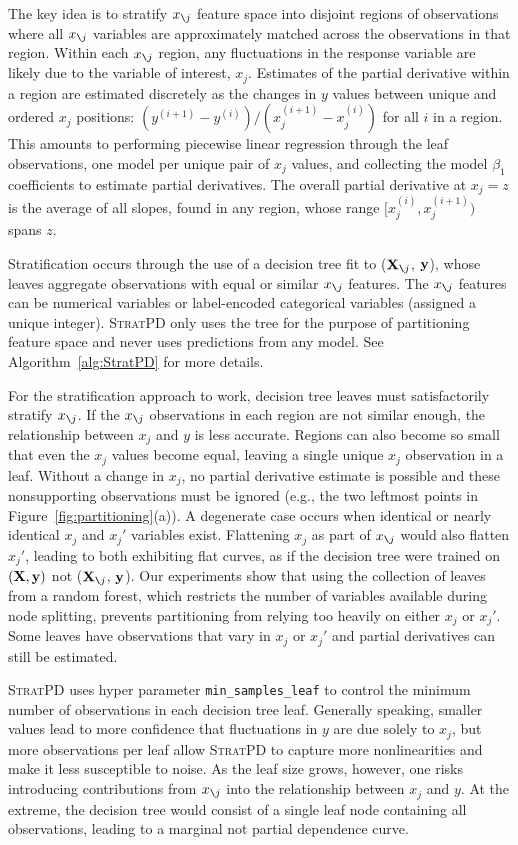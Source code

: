 \documentclass{article}
\newcommand{\figref}[1]{Figure~\ref{#1}}
\newcommand{\algref}[1]{Algorithm~\ref{#1}}
\newcommand{\spd}{\fontfamily{cmr}\textsc{\small StratPD}}
\newcommand{\Xnj}{${\bf X}_{\texttt{\char`\\} j}$}
\newcommand{\xnj}{$x_{\texttt{\char`\\} j}$}
\newcommand{\yi}{y^{(i)}}
\begin{document}
The key idea is to stratify \xnj{} feature space into disjoint regions of observations where all \xnj{} variables are approximately matched across the observations in that region. Within each \xnj{} region, any fluctuations in the response variable are likely due to the variable of interest, $x_j$.  Estimates of the partial derivative within a region are estimated discretely as the changes in $y$ values between unique and ordered $x_j$ positions:  $(y^{(i+1)} - \yi)/(x_j^{(i+1)} - x_j^{(i)})$ for all $i$ in a region.  This amounts to performing piecewise linear regression through the leaf observations, one model per unique pair of $x_j$ values, and collecting the model $\beta_1$ coefficients to estimate partial derivatives. The overall partial derivative at $x_j=z$ is the average of all slopes, found in any region, whose range $[x_j^{(i)},x_j^{(i+1)})$ spans $z$.  

Stratification occurs through the use of a decision tree fit to (\Xnj, $\bf y$), whose leaves aggregate observations with equal or similar \xnj{} features. The \xnj{} features can be numerical variables or label-encoded categorical variables (assigned a unique integer). \spd{} only uses the tree for the purpose of partitioning feature space and never uses predictions from any model. See \algref{alg:StratPD} for more details.

For the stratification approach to work, decision tree leaves must satisfactorily stratify \xnj{}. If the \xnj{} observations in each region are not similar enough, the relationship between $x_j$ and $y$   is less accurate.  Regions can also become so small that even the $x_j$ values become equal, leaving a single unique $x_j$ observation in a leaf. Without a change in $x_j$, no partial derivative estimate is possible and these nonsupporting observations must be  ignored (e.g., the two leftmost points in \figref{fig:partitioning}(a)). A degenerate case occurs when identical or nearly identical $x_j$ and $x_j'$ variables exist. Flattening $x_j$ as part of \xnj{} would also flatten $x_j'$, leading to both exhibiting flat curves, as if the decision tree were trained on $(\bf X, y)$ not (\Xnj, $\bf y$). Our experiments show that using the collection of leaves from a random forest, which restricts the number of variables available during node splitting, prevents partitioning from relying too heavily on either $x_j$ or $x_j'$. Some leaves have observations that vary in $x_j$ or $x_j'$ and partial derivatives can still be estimated.

\spd{} uses hyper parameter {\tt\small min\_samples\_leaf} to control the minimum number of observations in each decision tree leaf.  Generally speaking, smaller values lead to more confidence that fluctuations in $y$ are due solely to $x_j$, but more observations per leaf allow \spd{} to capture more nonlinearities and make it less susceptible to noise.  As the leaf size grows, however, one risks introducing contributions from \xnj{} into the relationship between $x_j$ and $y$. At the extreme, the decision tree would consist of a single leaf node containing all observations, leading to a marginal not partial dependence curve.
\end{document}
